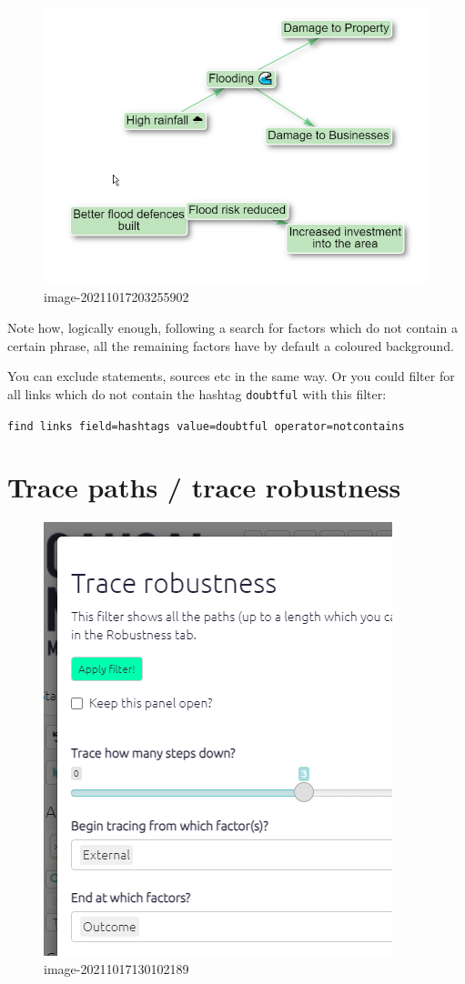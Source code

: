 \documentclass[
]{book}
\begin{document}
\begin{figure}
\centering
\includegraphics{_assets/image-20211017203255902.png}
\caption{image-20211017203255902}
\end{figure}

Note how, logically enough, following a search for factors which do not contain a certain phrase, all the remaining factors have by default a coloured background.

You can exclude statements, sources etc in the same way. Or you could filter for all links which do not contain the hashtag \texttt{doubtful} with this filter:

\texttt{find\ links\ field=hashtags\ value=doubtful\ operator=notcontains}

\hypertarget{trace-paths-trace-robustness}{%
\section{Trace paths / trace robustness}\label{trace-paths-trace-robustness}}

\begin{figure}
\centering
\includegraphics{_assets/image-20211017130102189.png}
\caption{image-20211017130102189}
\end{figure}
\end{document}
